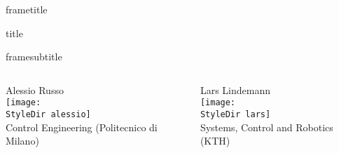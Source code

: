 {
	\vspace{-2.1mm}
	\begin{beamercolorbox}[wd=\paperwidth,ht=7mm,leftskip=2mm,dp=4mm]{frametitle}	
		\hfill
	\end{beamercolorbox}
	
	\vskip-1.0mm %
	
	\begin{beamercolorbox}[wd=\paperwidth,ht=10mm,leftskip=2mm,dp=10mm, rightskip = 0.5mm]{title}
		\begin{minipage}[c]{1.0\paperwidth} 
			 \inserttitle \newline
			 \insertsubtitle
		\end{minipage}
	\end{beamercolorbox}
	
	\vskip-1.4mm %
	\begin{beamercolorbox}[wd=\paperwidth,ht=62.0mm,leftskip=2mm,dp=144mm, rightskip = 0.5mm]{framesubtitle}
	\begin{columns}
		\begin{center}
	 		Alessio Russo\\
			\vspace{1mm}
			\texttt{[image: \\StyleDir alessio]}\\
			Control Engineering (Politecnico di Milano)
		\end{center}	 
		\begin{center}
			Lars Lindemann\\
			\vspace{1mm}
			\texttt{[image: \\StyleDir lars]}\\
			Systems, Control and Robotics (KTH)\\
		\end{center}	
		\end{columns}	
	\vspace{10mm}
	\insertinstitute  \newline
	\insertdate
	\end{beamercolorbox}
}

